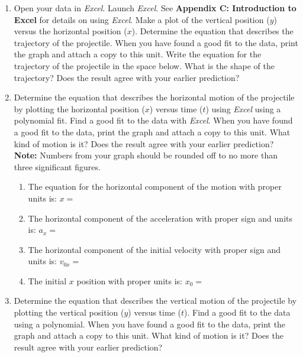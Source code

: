 \begin{enumerate}
\item  Open your data in \textit{Excel}.
Launch \textit{Excel}. 
See \textbf{Appendix C: Introduction to Excel} for details on using
\textit{Excel}. Make a plot of the vertical position ($y$) versus the
horizontal position ($x$). Determine the equation that describes the trajectory
of the projectile. When you have found a good fit to the data, print the graph
and attach a copy to this unit. Write the equation for the trajectory of the
projectile in the space below. What is the shape of the trajectory? Does the
result agree with your earlier prediction?
\vspace{20mm}

\item Determine the equation that describes the horizontal motion of the projectile
by plotting the horizontal position ($x$) versus time ($t$) using 
\textit{Excel} using a polynomial fit.
Find a good fit to the data with \textit{Excel}. When you have
found a good fit to the data, print the graph and attach a copy to this unit.
What kind of motion is it? Does the result agree with your earlier prediction?
\textbf{Note:} Numbers from your graph should be rounded off to no more than three significant figures.
\vspace{6mm}

\begin{enumerate}
\item The equation for the horizontal component of the motion with proper units is:
$x =$\vspace{5mm}

\item The horizontal component of the acceleration with proper sign and units is:
\( a_{x}= \) \vspace{5mm}

\item The horizontal component of the initial velocity with proper sign and units
is: \( v_{0x}= \)\vspace{5mm}

\item The initial $x$ position with proper units is: \( x_{0}= \)\vspace{5mm}

\end{enumerate}

\item Determine the equation that describes the vertical motion of the projectile
by plotting the vertical position ($y$) versus time ($t$). Find a good fit to the
data using a polynomial.  When you have found a good fit to the data, print the graph and attach
a copy to this unit. What kind of motion is it? Does the result agree with your
earlier prediction?
\vspace{20mm}


\end{enumerate}
